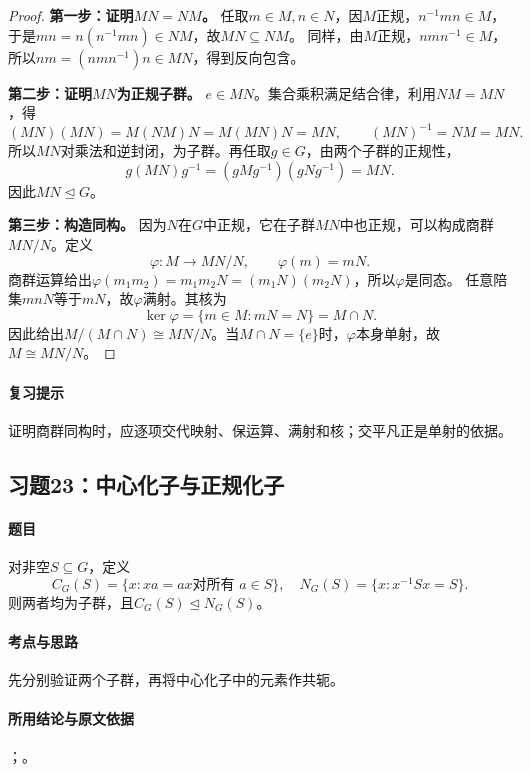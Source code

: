 \begin{proof}
\textbf{第一步：证明$MN=NM$。}
任取$m\in M,n\in N$，因$M$正规，$n^{-1}mn\in M$，于是$mn=n(n^{-1}mn)\in NM$，故$MN\subseteq NM$。
同样，由$M$正规，$nmn^{-1}\in M$，所以$nm=(nmn^{-1})n\in MN$，得到反向包含。

\textbf{第二步：证明$MN$为正规子群。}
$e\in MN$。集合乘积满足结合律，利用$NM=MN$，得
\[
(MN)(MN)=M(NM)N=M(MN)N=MN,
\qquad (MN)^{-1}=NM=MN.
\]
所以$MN$对乘法和逆封闭，为子群。再任取$g\in G$，由两个子群的正规性，
\[
g(MN)g^{-1}=(gMg^{-1})(gNg^{-1})=MN.
\]
因此$MN\trianglelefteq G$。

\textbf{第三步：构造同构。}
因为$N$在$G$中正规，它在子群$MN$中也正规，可以构成商群$MN/N$。定义
\[
\varphi:M\longrightarrow MN/N,\qquad \varphi(m)=mN.
\]
商群运算给出$\varphi(m_1m_2)=m_1m_2N=(m_1N)(m_2N)$，所以$\varphi$是同态。
任意陪集$mnN$等于$mN$，故$\varphi$满射。其核为
\[
\ker\varphi=\{m\in M:mN=N\}=M\cap N.
\]
因此给出$M/(M\cap N)\cong MN/N$。当$M\cap N=\{e\}$时，$\varphi$本身单射，故$M\cong MN/N$。
\end{proof}

\paragraph{复习提示}
证明商群同构时，应逐项交代映射、保运算、满射和核；交平凡正是单射的依据。


\subsection{习题23：\texorpdfstring{中心化子与正规化子}{中心化子与正规化子}}
\label{ex:1:23}

\paragraph{题目}
对非空$S\subseteq G$，定义
\[
C_G(S)=\{x:xa=ax\text{对所有 }a\in S\},\quad
N_G(S)=\{x:x^{-1}Sx=S\}.
\]
则两者均为子群，且$C_G(S)\trianglelefteq N_G(S)$。

\paragraph{考点与思路}
先分别验证两个子群，再将中心化子中的元素作共轭。

\paragraph{所用结论与原文依据}
；。

